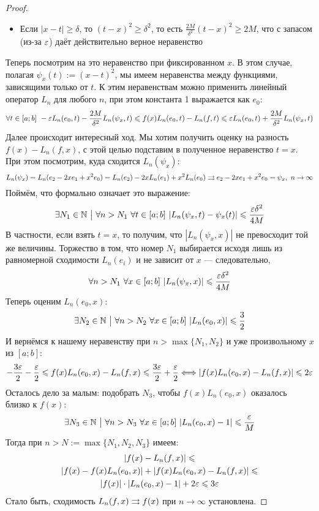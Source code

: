 \begin{proof}
\begin{itemize}
		\item Если $|x - t| \ge \delta$, то $(t - x)^2 \ge \delta^2$, то есть $\frac{2M}{\delta^2}(t - x)^2 \ge 2M$, что с запасом (из-за $\varepsilon$) даёт действительно верное неравенство
	\end{itemize}
	Теперь посмотрим на это неравенство при фиксированном $x$. В этом случае, полагая $\psi_x(t) := (x - t)^2$, мы имеем неравенства между функциями, зависящими только от $t$. К этим неравенствам можно применить линейный оператор $L_n$ для любого $n$, при этом константа 1 выражается как $e_0$:
	\[
		\forall t \in [a; b] \ -\varepsilon L_n(e_0, t) - \frac{2M}{\delta^2}L_n(\psi_x, t) \leqslant f(x)L_n(e_0, t) - L_n(f, t) \leqslant \varepsilon L_n(e_0, t) + \frac{2M}{\delta^2}L_n(\psi_x, t)
	\]
	Далее происходит интересный ход. Мы хотим получить оценку на разность $f(x) - L_n(f, x)$, с этой целью подставим в полученное неравенство $t = x$. 
	При этом посмотрим, куда сходится $L_n(\psi_x)$:
	\[
		L_n(\psi_x) = L_n(e_2 - 2xe_1 + x^2e_0) = 
		L_n(e_2) - 2xL_n(e_1) + x^2L_n(e_0) \rightrightarrows
		\\
		e_2 - 2xe_1 + x^2e_0 = \psi_x,\ n \to \infty
	\]
	Поймём, что формально означает это выражение:
	\[
		\exists N_1 \in \N \such \forall n > N_1\ \forall t \in [a; b]\ |L_n(\psi_x, t) - \psi_x(t)| \le \frac{\eps\delta^2}{4M}
	\]
	В частности, если взять $t = x$, то получим, что $|L_n(\psi_x, x)|$ не превосходит той же величины. Торжество в том, что номер $N_1$ выбирается исходя лишь из равномерной сходимости $L_n(e_i)$ и не зависит от $x$ --- следовательно,
	\[
		\forall n > N_1\ \forall x \in [a; b]\ |L_n(\psi_x, x)| \le \frac{\eps\delta^2}{4M}
	\]
	Теперь оценим $L_n(e_0, x)$:
	\[
		\exists N_2 \in \mathbb{N} \ \big|\  \forall n > N_2\ \forall x \in [a; b]\ |L_n(e_0, x)| \leqslant \frac{3}{2}
	\]
	И вернёмся к нашему неравенству при $n > \max\{N_1, N_2\}$ и уже произвольному $x$ из $[a; b]$:
	\[
		-\frac{3\varepsilon}{2} - \frac{\varepsilon}{2} \leqslant f(x)L_n(e_0, x) - L_n(f, x) \leqslant \frac{3\varepsilon}{2} + \frac{\varepsilon}{2} \Longleftrightarrow |f(x)L_n(e_0, x) - L_n(f, x)| \leqslant 2\varepsilon
	\]
	Осталось дело за малым: подобрать $N_3$, чтобы $f(x)L_n(e_0, x)$ оказалось близко к $f(x)$:
	\[
		\exists N_3 \in \mathbb{N} \ \big|\  \forall n > N_3\ \forall x \in [a; b]\ |L_n(e_0, x) - 1| \leqslant \frac{\varepsilon}{M}
	\]
	Тогда при $n > N := \max\{N_1, N_2, N_3\}$ имеем:
	\begin{multline*}
		|f(x) - L_n(f, x)| \leqslant
		\\
		|f(x) - f(x)L_n(e_0, x)| + |f(x)L_n(e_0, x) - L_n(f, x)| \leqslant
		\\
		|f(x)| \cdot |L_n(e_0, x) - 1| + 2\varepsilon \leqslant 3\varepsilon
	\end{multline*}
	Стало быть, сходимость $L_n(f, x) \rightrightarrows f(x)$ при $n \to \infty$ установлена.
\end{proof}

